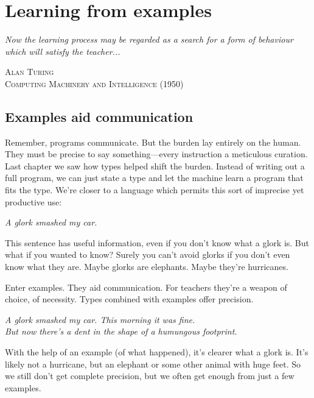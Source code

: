 \chapter{Learning from examples}
\begin{singlespace}
\setlength{\epigraphwidth}{0.6\textwidth}
\epigraph{\textit{Now the learning process may be regarded as a search for a form of 
behaviour which will satisfy the teacher...}}{\textsc{Alan Turing \\  Computing Machinery and Intelligence (1950)}}
\end{singlespace}



\section{Examples aid communication}

Remember, programs communicate. But the burden lay entirely on the human. They must be precise to say something---every instruction a meticulous curation. Last chapter we saw how types helped shift the burden. Instead of writing out a full program, we can just state a type and let the machine learn a program that fits the type. We're closer to a language which permits this sort of imprecise yet productive use:
\begin{displayquote}
\centering
\textit{A glork smashed my car.}
\end{displayquote}
This sentence has useful information, even if you don't know what a glork is. But what if  you wanted to know? Surely you can't avoid glorks if you don't even know what they are. Maybe glorks are elephants. Maybe they're hurricanes.

Enter examples. They aid communication. For teachers they're a weapon of choice, of necessity. Types combined with examples offer precision.
\begin{displayquote}
\centering
\textit{A glork smashed my car. This morning it was fine. \\But now there's a dent in the shape of a humungous footprint.}
\end{displayquote}

With the help of an example (of what happened), it's clearer what a glork is. It's likely not a hurricane, but an elephant or some other animal with huge feet. So we still don't get complete precision, but we often get enough from just a few examples.

